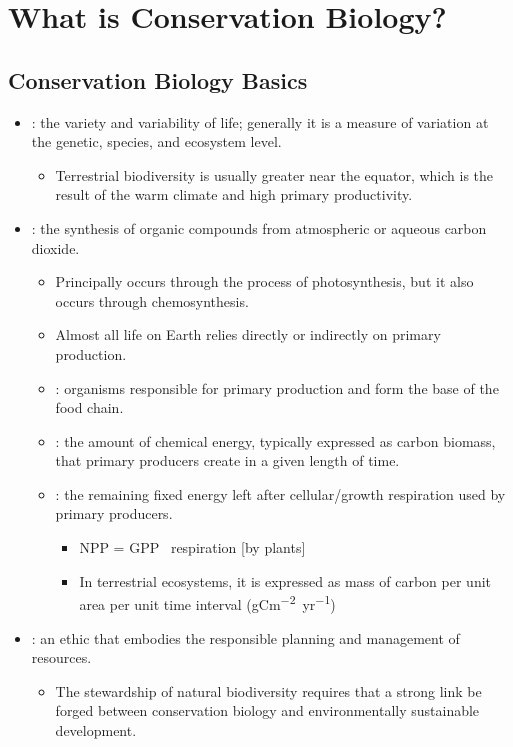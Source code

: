 \documentclass{inVerba-notes}
\begin{document}
\tableofcontents

\chapter{What is Conservation Biology?}\label{What is Conservation Biology}
\section{Conservation Biology Basics}\label{Conservation Biology Basics}
\begin{itemize}
    \item {}: the variety and variability of life; generally it is a measure of variation at the genetic, species, and ecosystem level.
        \begin{itemize}
            \item Terrestrial biodiversity is usually greater near the equator, which is the result of the warm climate and high primary productivity.
        \end{itemize}
    \item {}: the synthesis of organic compounds from atmospheric or aqueous carbon dioxide.
        \begin{itemize}
            \item Principally occurs through the process of photosynthesis, but it also occurs through chemosynthesis.
            \item Almost all life on Earth relies directly or indirectly on primary production. 
            \item {}: organisms responsible for primary production and form the base of the food chain.
            \item {}: the amount of chemical energy, typically expressed as carbon biomass, that primary producers create in a given length of time. 
            \item {}: the remaining fixed energy left after cellular/growth respiration used by primary producers.
                \begin{itemize}
                    \item NPP = GPP \minus\ respiration [by plants]
                    \item In terrestrial ecosystems, it is expressed as mass of carbon per unit area per unit time interval (\si{gCm^{-2}yr^{-1}})
                \end{itemize}
        \end{itemize}
    \item {}: an ethic that embodies the responsible planning and management of resources.
        \begin{itemize}
            \item The stewardship of natural biodiversity requires that a
            strong link be forged between conservation biology and environmentally sustainable development.
        \end{itemize}


\end{itemize}
\end{document}
